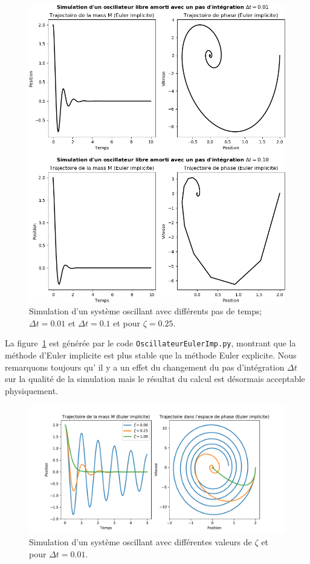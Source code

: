 \documentclass[%
oneside,                 %
final,                   %
10pt]{article}
\begin{document}
\begin{figure}[!ht]  %
  \centerline{\includegraphics[width=0.7\linewidth]{scripts/Eulerimp_3.png}}
  \caption{
  Simulation d'un système oscillant avec différents pas de temps; $\Delta t = 0.01$ et $\Delta t = 0.1$ et pour $\zeta = 0.25$. \label{fig:Eulerimp_3}
  }
\end{figure}


La figure~\ref{fig:Eulerimp_3} est générée par le code \texttt{OscillateurEulerImp.py}, montrant que la méthode d'Euler implicite est plus stable que la méthode Euler explicite. Nous remarquons toujours qu' il y a un effet du changement du pas d'intégration $\Delta t$ sur la qualité de la simulation mais le résultat du calcul est désormais acceptable physiquement.


\begin{figure}[!ht]  %
  \centerline{\includegraphics[width=0.7\linewidth]{scripts/EulerExpGen2.pdf}}
  \caption{
  Simulation d'un système oscillant avec différentes valeurs de $\zeta$ et pour $\Delta t = 0.01$. \label{fig:EulerExpGen2}
  }
\end{figure}
\end{document}
